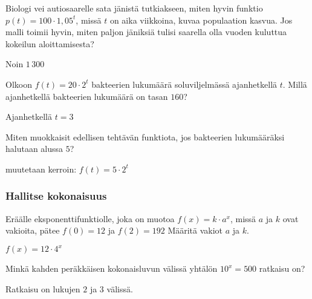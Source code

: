 \begin{tehtavasivu}
\begin{tehtava}
Biologi vei autiosaarelle sata jänistä tutkiakseen, miten hyvin funktio $ p(t)=100 \cdot 1,05^{t}$, missä $t$ on aika viikkoina, kuvaa populaation kasvua. Jos malli toimii hyvin, miten paljon jäniksiä tulisi saarella olla vuoden kuluttua kokeilun aloittamisesta?
\begin{vastaus}
Noin $1\,300$
\end{vastaus}
\end{tehtava}

\begin{tehtava}
Olkoon $f(t) = 20 \cdot 2^t$ bakteerien lukumäärä soluviljelmässä ajanhetkellä $t$. Millä ajanhetkellä bakteerien lukumäärä on tasan $160$?
\begin{vastaus}
Ajanhetkellä $t=3$ %
\end{vastaus}
\end{tehtava}

\begin{tehtava}
Miten muokkaisit edellisen tehtävän funktiota, jos bakteerien lukumääräksi halutaan alussa $5$?
\begin{vastaus}
muutetaan kerroin: $f(t) = 5 \cdot 2^t$
\end{vastaus}
\end{tehtava}

\subsubsection*{Hallitse kokonaisuus}

\begin{tehtava}
Eräälle eksponenttifunktiolle, joka on muotoa $ f(x)=k\cdot a^{x}  $, missä $ a $ ja $ k $ ovat vakioita, pätee $ f(0)=12 $ ja $ f(2)=192 $ Määritä vakiot $a$ ja $k$.
\begin{vastaus}
$f(x)=12\cdot 4^{x}$
\end{vastaus}
\end{tehtava}


\begin{tehtava}
Minkä kahden peräkkäisen kokonaisluvun välissä yhtälön $10^x = 500$ ratkaisu on?
\begin{vastaus}
Ratkaisu on lukujen $2$ ja $3$ välissä.
\end{vastaus}
\end{tehtava}



\end{tehtavasivu}
